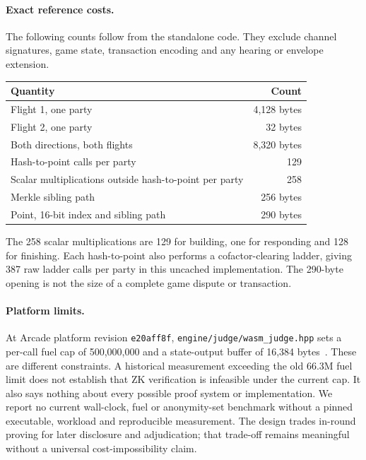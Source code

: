 \documentclass[11pt]{article}
\begin{document}
\paragraph{Exact reference costs.}
The following counts follow from the standalone code. They exclude channel
signatures, game state, transaction encoding and any hearing or envelope
extension.
\begin{center}
\begin{tabular}{lr}
\toprule
Quantity & Count \\
\midrule
Flight 1, one party & 4,128 bytes \\
Flight 2, one party & 32 bytes \\
Both directions, both flights & 8,320 bytes \\
Hash-to-point calls per party & 129 \\
Scalar multiplications outside hash-to-point per party & 258 \\
Merkle sibling path & 256 bytes \\
Point, 16-bit index and sibling path & 290 bytes \\
\bottomrule
\end{tabular}
\end{center}
The 258 scalar multiplications are 129 for building, one for responding and
128 for finishing. Each hash-to-point also performs a cofactor-clearing
ladder, giving 387 raw ladder calls per party in this uncached implementation.
The 290-byte opening is not the size of a complete game dispute or transaction.

\paragraph{Platform limits.}
At Arcade platform revision \texttt{e20aff8f},
\texttt{engine/judge/wasm\_judge.hpp} sets a per-call fuel cap of
500,000,000 and a state-output buffer of 16,384 bytes~\cite{platformrepo}.
These are different constraints. A historical measurement exceeding the old
66.3M fuel limit does not establish that ZK verification is infeasible under the
current cap. It also says nothing about every possible proof system or
implementation. We report no current wall-clock, fuel or anonymity-set
benchmark without a pinned executable, workload and reproducible measurement.
The design trades in-round proving for later disclosure and adjudication; that
trade-off remains meaningful without a universal cost-impossibility claim.
\end{document}
